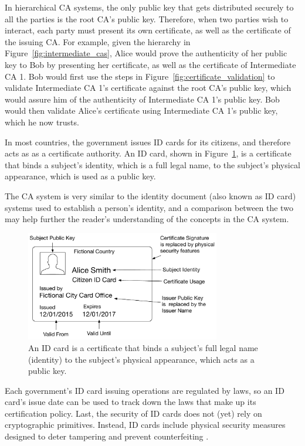 In hierarchical CA systems, the only public key that gets distributed securely
to all the parties is the root CA's public key. Therefore, when two parties
wish to interact, each party must present its own certificate, as well as the
certificate of the issuing CA. For example, given the hierarchy in
Figure~\ref{fig:intermediate_cas}, Alice would prove the authenticity of her
public key to Bob by presenting her certificate, as well as the certificate of
Intermediate CA 1. Bob would first use the steps in
Figure~\ref{fig:certificate_validation} to validate Intermediate CA 1's
certificate against the root CA's public key, which would assure him of the
authenticity of Intermediate CA 1's public key. Bob would then validate Alice's
certificate using Intermediate CA 1's public key, which he now trusts.

In most countries, the government issues ID cards for its citizens, and
therefore acts as as a certificate authority. An ID card, shown in
Figure~\ref{fig:id_card_as_certificate}, is a certificate that binds a
subject's identity, which is a full legal name, to the subject's physical
appearance, which is used as a public key.

The CA system is very similar to the identity document (also known as ID card)
systems used to establish a person's identity, and a comparison between the two
may help further the reader's understanding of the concepts in the CA system.

\begin{figure}[hbt]
  \centering
  \includegraphics[width=85mm]{figures/id_card_as_certificate.pdf}
  \caption{
    An ID card is a certificate that binds a subject's full legal name
    (identity) to the subject's physical appearance, which acts as a public
    key.
  }
  \label{fig:id_card_as_certificate}
\end{figure}

Each government's ID card issuing operations are regulated by laws, so an ID
card's issue date can be used to track down the laws that make up its
certification policy. Last, the security of ID cards does not (yet) rely on
cryptographic primitives. Instead, ID cards include physical security measures
designed to deter tampering and prevent counterfeiting .


